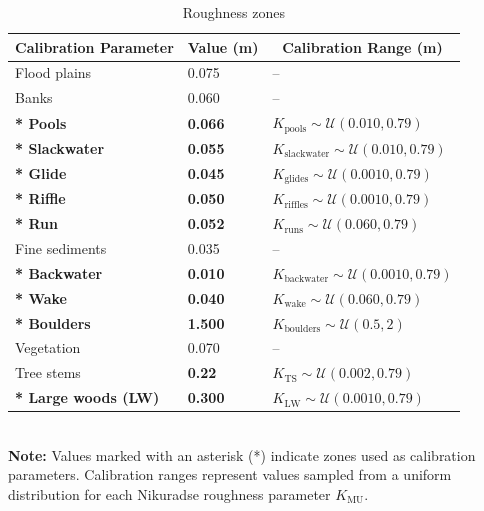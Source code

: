 \documentclass[draft,linenumbers,onecolumn]{agujournal2019} %
\begin{document}
\begin{table}[H]
	\centering
	\caption{Roughness zones}
	\begin{tabular}{p{5.5cm} p{3cm} p{5.5cm}}
		\hline
		\multicolumn{1}{c}{\textbf{Calibration Parameter}} & 
		\multicolumn{1}{c}{\textbf{Value (m)}} & 
		\multicolumn{1}{c}{\textbf{Calibration Range (m)}} \\ \hline
		Flood plains              & 0.075   & -- \\
		Banks                     & 0.060   & -- \\
		\textbf{* Pools}          & \textbf{0.066}   & \( K_{\text{pools}} \sim \mathcal{U}(0.010, 0.79) \) \\
		\textbf{* Slackwater}     & \textbf{0.055}   & \( K_{\text{slackwater}} \sim \mathcal{U}(0.010, 0.79) \) \\
		\textbf{* Glide}          & \textbf{0.045}   & \( K_{\text{glides}} \sim \mathcal{U}(0.0010, 0.79) \) \\
		\textbf{* Riffle}         & \textbf{0.050}   & \( K_{\text{riffles}} \sim \mathcal{U}(0.0010, 0.79) \) \\
		\textbf{* Run}            & \textbf{0.052}   & \( K_{\text{runs}} \sim \mathcal{U}(0.060, 0.79) \) \\
		Fine sediments            & 0.035   & -- \\
		\textbf{* Backwater}      & \textbf{0.010}   & \( K_{\text{backwater}} \sim \mathcal{U}(0.0010, 0.79) \) \\
		\textbf{* Wake}           & \textbf{0.040}   & \( K_{\text{wake}} \sim \mathcal{U}(0.060, 0.79) \) \\
		\textbf{* Boulders}       & \textbf{1.500}   & \( K_{\text{boulders}} \sim \mathcal{U}(0.5, 2) \) \\
		Vegetation                & 0.070   & -- \\
		Tree stems                & \textbf{0.22}   & \( K_{\text{TS}} \sim \mathcal{U}(0.002,0.79) \) \\
		\textbf{* Large woods (LW)} & \textbf{0.300} & \( K_{\text{LW}} \sim \mathcal{U}(0.0010, 0.79) \) \\ \hline
	\end{tabular}
	\label{tab:roughness_zones}
	\\
	\textbf{Note:} Values marked with an asterisk (*) indicate zones used as calibration parameters. Calibration ranges represent values sampled from a uniform distribution for each Nikuradse roughness parameter \( K_{\text{MU}} \).
\end{table}
\end{document}
